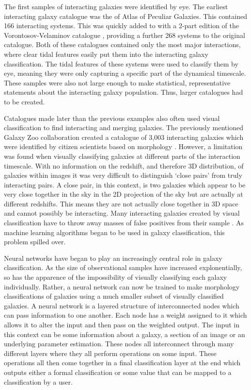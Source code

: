The first samples of interacting galaxies were identified by eye. The earliest interacting galaxy catalogue was the \citet{Arp catalogue} of Atlas of Peculiar Galaxies. This contained 166 interacting systems. This was quickly added to with a 2-part edition of the Vorontosov-Velaminov catalogue \citep{Both parts of the VV catalogue}, providing a further 268 systems to the original \citet{Arp} catalogue. Both of these catalogues contained only the most major interactions, where clear tidal features easily put them into the interacting galaxy classification. The tidal features of these systems were used to classify them by eye, meaning they were only capturing a specific part of the dynamical timescale. These samples were also not large enough to make statistical, representative statements about the interacting galaxy population. Thus, larger catalogues had to be created.

Catalogues made later than the previous examples also often used visual classification to find interacting and merging galaxies. The previously mentioned Galaxy Zoo collaboration created a catalogue of 3,003 interacting galaxies which were identified by citizen scientists based on morphology \citep{Darg et all. paper}. However, a limitation was found when visually classifying galaxies at different parts of the interaction timescale. With no information on the redshift, and therefore 3D distribution, of galaxies within images it was very difficult to distinguish `close pairs' from truly interacting pairs. A close pair, in this context, is two galaxies which appear to be very close together in the sky in the 2D projection of the sky but are actually at different redshifts. This means they are not actually close together in 3D space and cannot possibly be interacting. Many interacting galaxies created by visual classification have to throw away masses of false positives from their sample \citep{Papers saying large numbers of interacting galaxies are removed.}. As machine learning algorithms began to be used in galaxy classification, this problem spilled over.

Neural networks have began to play an increasingly central role in galaxy classification. As the size of observational samples have increased explonentially, so has the apparence of the impossibility of visually classifying each galaxy individually. Rather, a neural network can now be trained to make morphology classifications of galaxies using a much smaller subset of visually classified galaxies. A neural network is a layered structure of interconnected nodes which can pass information to one another. Each node has a weight assigned to it which allows it to alter the input and then pass on the weighted output. The input in this context can be some information about a galaxy, a section of an image or an underlying parameter estimation. These nodes all interconnect through many different layers where they all perform operations on some input. These operations all then come together in a final classification layer at the end which outputs either a formal classification or some value that can be mapped to a classification by a user.


